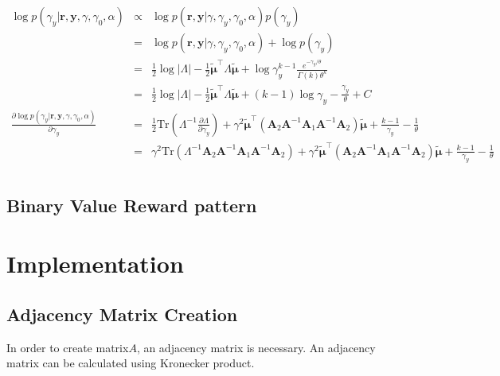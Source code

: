 \documentclass[platex, a4paper]{jsarticle}
\begin{document}
\begin{eqnarray}
  \log p(\gamma_y | \bm{r}, \bm{y},\gamma, \gamma_0, \alpha)
      &\propto& \log p( \bm{r}, \bm{y} | \gamma, \gamma_y, \gamma_0, \alpha)p(\gamma_y) \\
      &=& \log p( \bm{r}, \bm{y} | \gamma, \gamma_y, \gamma_0, \alpha) + \log p(\gamma_y) \\
      &=& \frac{1}{2} \log|\Lambda| - \frac{1}{2} \tilde{\bm{\mu}}^\top \Lambda \tilde{\bm{\mu}}
        + \log \gamma_y^{k-1} \frac{e^{-\gamma_y/\theta}}{\Gamma(k) \theta^k} \\
      &=& \frac{1}{2} \log|\Lambda| - \frac{1}{2} \tilde{\bm{\mu}}^\top \Lambda \tilde{\bm{\mu}}
        + (k-1)\log \gamma_y -  \frac{\gamma_y}{\theta} + C \\
  \frac{\partial \log p(\gamma_y | \bm{r}, \bm{y}, \gamma, \gamma_0, \alpha)}{\partial \gamma_y}
      &=& \frac{1}{2} \mathrm{Tr}( \Lambda^{-1} \frac{\partial \Lambda}{\partial \gamma_y})
        + \gamma^2   \tilde{\bm{\mu}}^\top \left(\bm{A}_2 \bm{A}^{-1} \bm{A}_1 \bm{A}^{-1} \bm{A}_2  \right)  \tilde{\bm{\mu}}
        + \frac{k-1}{\gamma_y} - \frac{1}{\theta} \\
      &=& \gamma^2 \mathrm{Tr}( \Lambda^{-1} \bm{A}_2 \bm{A}^{-1} \bm{A}_1 \bm{A}^{-1} \bm{A}_2)
        + \gamma^2  \tilde{\bm{\mu}}^\top \left(\bm{A}_2 \bm{A}^{-1} \bm{A}_1 \bm{A}^{-1} \bm{A}_2  \right)  \tilde{\bm{\mu}}
        + \frac{k-1}{\gamma_y} - \frac{1}{\theta} \\
\end{eqnarray}

\subsection{Binary Value Reward pattern}


\section{Implementation}
\subsection{Adjacency Matrix Creation}
In order to create matrix$A$, an adjacency matrix is necessary.
An adjacency matrix can be calculated using Kronecker product.
\end{document}
